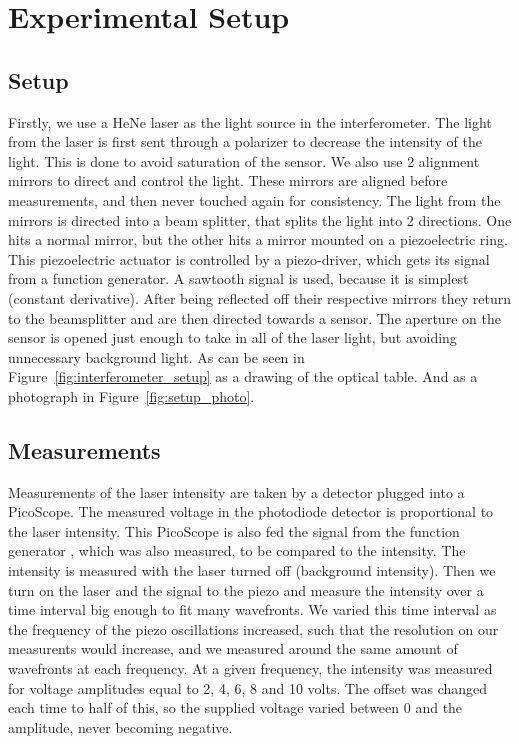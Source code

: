 \chapter{Experimental Setup}
\section{Setup}
Firstly, we use a HeNe laser \autocite{thorlabs_hnls008l_spec} as the light source in the interferometer.
The light from the laser is first sent through a polarizer to decrease the intensity of the light. 
This is done to avoid saturation of the sensor.
We also use 2 alignment mirrors to direct and control the light.
These mirrors are aligned before measurements, and then never touched again for consistency.
The light from the mirrors is directed into a beam splitter, that splits the light into 2 directions.
One hits a normal mirror, but the other hits a mirror mounted on a piezoelectric ring\autocite{thorlabs_pa44lew_datasheet_2024}. 
This piezoelectric actuator is controlled by a piezo-driver\autocite{thorlabs_mdt630b_datasheet_2026}, 
which gets its signal from a function generator\autocite{FunctionGenerator}. A sawtooth signal is used, because it is simplest (constant derivative).
After being reflected off their respective mirrors they return to the beamsplitter and are then directed towards a sensor.
The aperture on the sensor is opened just enough to take in all of the laser light, but avoiding unnecessary background light. 
As can be seen in Figure~\ref{fig:interferometer_setup} as a drawing of the optical table. And as a photograph in Figure~\ref{fig:setup_photo}.
\section{Measurements}
Measurements of the laser intensity are taken by a detector \autocite{thorlabs_det100a_manual} plugged into a PicoScope\autocite{PicoScope3203D}. 
The measured voltage in the photodiode detector is proportional to the laser intensity. 
This PicoScope is also fed the signal from the function generator \autocite{FunctionGenerator}, 
which was also measured, to be compared to the intensity.
The intensity is measured with the laser turned off (background intensity). 
Then we turn on the laser and the signal to the piezo and measure the intensity over a time interval big enough to fit many wavefronts.
We varied this time interval as the frequency of the piezo oscillations increased, 
such that the resolution on our measurents would increase,
and we measured around the same amount of wavefronts at each frequency. 
At a given \mbox{frequency}, the intensity was measured for voltage amplitudes equal to 2, 4, 6, 8 and 10 volts. 
The offset was changed each time to half of this, 
so the supplied voltage varied between 0 and the amplitude, never becoming negative.
